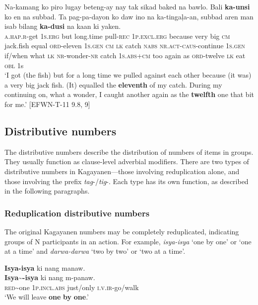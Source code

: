  \gll Na-kamang  ko  piro  lugay  beteng-ay  nay  tak  sikad  baked na  bawlo.  Bali  \textbf{ka-unsi}  ko  en  na  subbad.  Ta pag-pa-dayon  ko  daw  ino  na  ka-tingaļa-an,  subbad aren  man  isab  bilang  \textbf{ka-dusi}  na  kaan  ki  yaken. \\
\textsc{a.hap.r}-get  1\textsc{s.erg}  but  long.time  pull-\textsc{rec}  1\textsc{p.excl.erg}  because  very  big \textsc{cm}  jack.fish  equal  \textsc{ord}-eleven  1\textsc{s.gen}  \textsc{cm}  \textsc{lk}  catch  \textsc{nabs}
\textsc{nr.act}-\textsc{caus}-continue  1\textsc{s.gen}  if/when  what  \textsc{lk}  \textsc{nr}-wonder-\textsc{nr}  catch 1\textsc{s.abs+cm}  too  again  as  \textsc{ord}-twelve  \textsc{lk}  eat  \textsc{obl}  1s \\
\glt `I got (the fish) but for a long time we pulled against each other because (it was) a very big jack fish. (It) equalled the \textbf{eleventh} of my catch. During my continuing on, what a wonder, I caught another again as the \textbf{twelfth} one that bit for me.’ [EFWN-T-11 9.8, 9]
 
\z

\subsection{Distributive numbers}
\label{bkm:Ref479572999}    

The distributive numbers describe the distribution of numbers of items in groups. They usually function as clause-level adverbial modifiers. There are two types of distributive numbers in Kagayanen---those involving reduplication alone, and those involving the prefix \textit{tag}-/\textit{tig}-. Each type has its own function, as described in the following paragraphs.

\subsubsection{Reduplication distributive numbers}
\label{sec:reduplicationdistributivenumbers} 

The original Kagayanen numbers may be completely reduplicated, indicating groups of N participants in an action. For example, \textit{isya-isya} ‘one by one’ or ‘one at a time’ and \textit{darwa-darwa} ‘two by two’ or ‘two at a time’.

\ea
\textbf{Isya-isya}  ki  nang  manaw. \\\smallskip
 \gll \textbf{Isya\sim{}-isya}  ki  nang  m-panaw. \\
\textsc{red}\sim{}one  1\textsc{p.incl.abs}  just/only  \textsc{i.v.ir}-go/walk \\
\glt ‘We will leave \textbf{one} \textbf{by} \textbf{one}.’
\z


